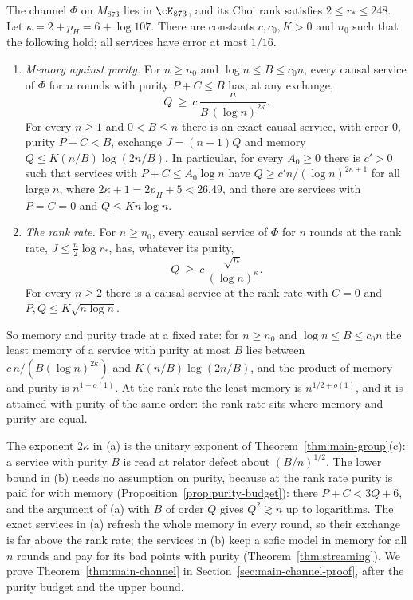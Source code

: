 \begin{theorem}[Theorem B]\label{thm:main-channel}
The channel $\Phi$ on $M_{873}$ lies in $\cK_{873}$, and its Choi rank satisfies $2\le r_*\le248$. Let $\kappa=2+p_H=6+\log107$. There are
constants $c,c_0,K>0$ and $n_0$ such that the following hold; all services have error at most $1/16$.
\begin{enumerate}[label=(\alph*),itemsep=1pt]
\item \emph{Memory against purity.} For $n\ge n_0$ and $\log n\le B\le c_0n$, every causal service of $\Phi$ for $n$ rounds with purity
$P+C\le B$ has, at any exchange,
\[
Q\ \ge\ c\,\frac{n}{B\,(\log n)^{2\kappa}} .
\]
For every $n\ge1$ and $0<B\le n$ there is an exact causal service, with error $0$, purity $P+C<B$, exchange $J=(n-1)Q$ and memory
$Q\le K(n/B)\log(2n/B)$. In particular, for every $A_0\ge0$ there is $c'>0$ such that services with $P+C\le A_0\log n$ have
$Q\ge c'n/(\log n)^{2\kappa+1}$ for all large $n$, where $2\kappa+1=2p_H+5<26.49$, and there are services with $P=C=0$ and $Q\le Kn\log n$.
\item \emph{The rank rate.} For $n\ge n_0$, every causal service of $\Phi$ for $n$ rounds at the rank rate, $J\le\frac n2\log r_*$, has, whatever
its purity,
\[
Q\ \ge\ c\,\frac{\sqrt n}{(\log n)^{\kappa}} .
\]
For every $n\ge2$ there is a causal service at the rank rate with $C=0$ and $P,Q\le K\sqrt{n\log n}$.
\end{enumerate}
So memory and purity trade at a fixed rate: for $n\ge n_0$ and $\log n\le B\le c_0n$ the least memory of a service with purity at most $B$ lies
between $c\,n/(B(\log n)^{2\kappa})$ and $K(n/B)\log(2n/B)$, and the product of memory and purity is $n^{1+o(1)}$. At the rank rate the least
memory is $n^{1/2+o(1)}$, and it is attained with purity of the same order: the rank rate sits where memory and purity are equal.
\end{theorem}

The exponent $2\kappa$ in (a) is the unitary exponent of Theorem~\ref{thm:main-group}(c): a service with purity $B$ is read at relator defect about
$(B/n)^{1/2}$. The lower bound in (b) needs no assumption on purity, because at the rank rate purity is paid for with memory
(Proposition~\ref{prop:purity-budget}): there $P+C<3Q+6$, and the argument of (a) with $B$ of order $Q$ gives $Q^2\gtrsim n$ up to logarithms. The
exact services in (a) refresh the whole memory in every round, so their exchange is far above the rank rate; the services in (b) keep a sofic
model in memory for all $n$ rounds and pay for its bad points with purity (Theorem~\ref{thm:streaming}). We prove Theorem~\ref{thm:main-channel} in Section~\ref{sec:main-channel-proof}, after the purity budget
and the upper bound.

